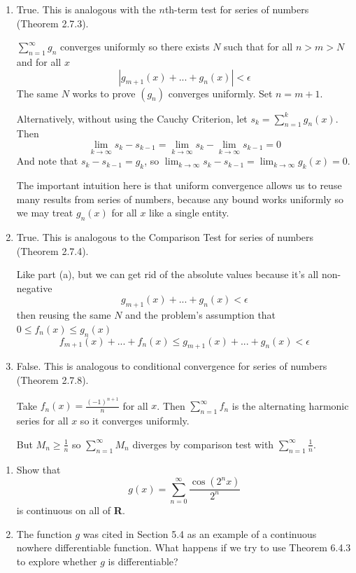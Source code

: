 \documentclass{oxmathproblems}
\begin{document}
\begin{questions}
\begin{solution}
  \begin{enumerate}[label=(\alph*)]
    \item True. This is analogous with the $n$th-term test for series of numbers (Theorem 2.7.3).
    
    $\sum_{n=1}^{\infty}g_{n}$ converges uniformly so there exists $N$ such that for all $n > m > N$ and for all $x$
    \[|g_{m+1}(x) + ... + g_{n}(x)| < \epsilon\]
    The same $N$ works to prove $(g_{n})$ converges uniformly. Set $n=m+1$.

    Alternatively, without using the Cauchy Criterion, let $s_{k} = \sum_{n=1}^{k}g_{n}(x)$. Then
    \[\lim_{k \to \infty}s_{k}-s_{k-1}=\lim_{k \to \infty}s_{k} - \lim_{k \to \infty}s_{k-1}=0\]
    And note that $s_{k}-s_{k-1}=g_{k}$, so $\lim_{k \to \infty}s_{k}-s_{k-1} = \lim_{k \to \infty}g_{k}(x)=0$.

    The important intuition here is that uniform convergence allows us to reuse many results from series of numbers,
    because any bound works uniformly so we may treat $g_{n}(x)$ for all $x$ like a single entity.
  
    \item True. This is analogous to the Comparison Test for series of numbers (Theorem 2.7.4).
    
    Like part (a), but we can get rid of the absolute values because it's all non-negative
    \[g_{m+1}(x) + ... + g_{n}(x) < \epsilon\]
    then reusing the same $N$ and the problem's assumption that $0 \leq f_{n}(x) \leq g_{n}(x)$
    \[f_{m+1}(x) + ... + f_{n}(x) \leq g_{m+1}(x) + ... + g_{n}(x) < \epsilon\]

    \item False. This is analogous to conditional convergence for series of numbers (Theorem 2.7.8).
    
    Take $f_{n}(x)=\frac{(-1)^{n+1}}{n}$ for all $x$.
    Then $\sum_{n=1}^{\infty}f_{n}$ is the alternating harmonic series for all $x$ so it converges uniformly.

    But $M_{n} \geq \frac{1}{n}$ so $\sum_{n=1}^{\infty}M_{n}$ diverges by comparison test with $\sum_{n=1}^{\infty}\frac{1}{n}$.
  \end{enumerate}
\end{solution}

\miquestion
\begin{enumerate}[label=(\alph*)]
  \item Show that
  \[g(x) = \sum_{n=0}^{\infty}\frac{\cos(2^{n}x)}{2^n}\]
  is continuous on all of \textbf{R}.
  \item The function $g$ was cited in Section 5.4 as an example of a continuous nowhere differentiable function. What happens if we try to use Theorem 6.4.3 to
  explore whether $g$ is differentiable?
\end{enumerate}


\end{questions}
\end{document}
